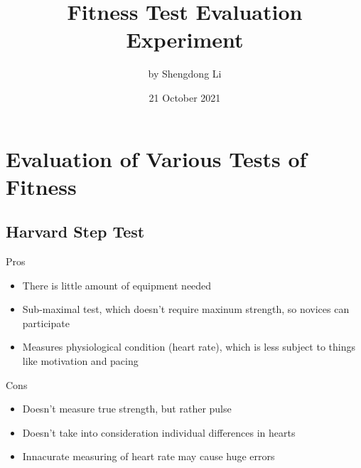 \documentclass[12pt]{article}
\begin{document}
\title{Fitness Test Evaluation Experiment}
\author{by Shengdong Li}
\date{21 October 2021}
\maketitle

\section*{Evaluation of Various Tests of Fitness}

\subsection*{Harvard Step Test}

\begin{minipage}[t]{0.5\textwidth}
    Pros
    \begin{itemize}
        \item There is little amount of equipment needed
        \item Sub-maximal test, which doesn't require maxinum strength, so novices can participate
        \item Measures physiological condition (heart rate), which is less subject to things like motivation and pacing
    \end{itemize}
\end{minipage}
\begin{minipage}[t]{0.5\textwidth}
    Cons
    \begin{itemize}
        \item Doesn't measure true strength, but rather pulse
        \item Doesn't take into consideration individual differences in hearts
        \item Innacurate measuring of heart rate may cause huge errors
    \end{itemize}
\end{minipage}
\end{document}
